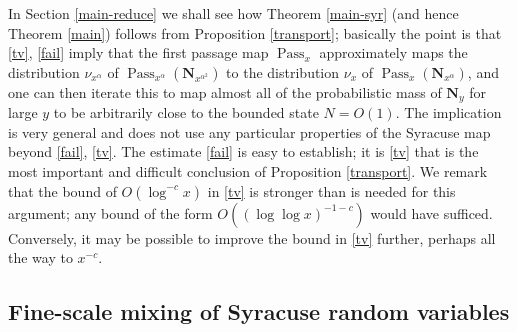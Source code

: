 \documentclass[12pt,a4paper,reqno]{amsart}
\numberwithin{equation}{section}
\theoremstyle{plain}
\theoremstyle{definition}
\newcommand\Pass{{\operatorname{Pass}}}
\begin{document}
In Section \ref{main-reduce} we shall see how Theorem \ref{main-syr} (and hence Theorem \ref{main}) follows from Proposition \ref{transport}; basically the point is that \eqref{tv}, \eqref{fail} imply that the first passage map $\Pass_x$ approximately maps the distribution $\nu_{x^\alpha}$ of $\Pass_{x^{\alpha}}( \mathbf{N}_{x^{\alpha^2}} )$ to the distribution $\nu_x$ of $\Pass_{x}( \mathbf{N}_{x^{\alpha}} )$, and one can then iterate this to map almost all of the probabilistic mass of $\mathbf{N}_y$ for large $y$ to be arbitrarily close to the bounded state $N=O(1)$.  The implication is very general and does not use any particular properties of the Syracuse map beyond \eqref{fail}, \eqref{tv}.  The estimate \eqref{fail} is easy to establish; it is \eqref{tv} that is the most important and difficult conclusion of Proposition \ref{transport}.  We remark that the bound of $O(\log^{-c} x)$ in \eqref{tv} is stronger than is needed for this argument; any bound of the form $O((\log\log x)^{-1-c})$ would have sufficed. Conversely, it may be possible to improve the bound in \eqref{tv} further, perhaps all the way to $x^{-c}$.

\subsection{Fine-scale mixing of Syracuse random variables}
\end{document}
